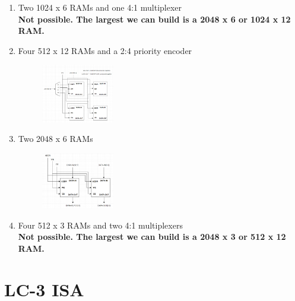 \documentclass{article}
\begin{document}
\begin{enumerate}[label=\alph*.]
\item Two 1024 x 6 RAMs and one 4:1 multiplexer \\
\textbf{Not possible. The largest we can build is a 2048 x 6 or 1024 x 12 RAM.}
\item Four 512 x 12 RAMs and a 2:4 priority encoder
\begin{figure}[!h]
    \centering
    \includegraphics[width=0.3\textwidth]{figures/memory3b-solution.png}
\end{figure}
\item Two 2048 x 6 RAMs	
\begin{figure}[!h]
    \centering
    \includegraphics[width=0.3\textwidth]{figures/memory3c-solution.png}
\end{figure}
\item Four 512 x 3 RAMs and two 4:1 multiplexers \\
\textbf{Not possible. The largest we can build is a 2048 x 3 or 512 x 12 RAM.}
\end{enumerate}


\newpage
\section*{LC-3 ISA}
\end{document}
